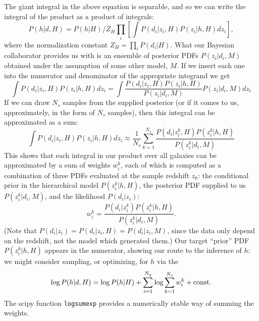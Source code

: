 \documentclass[11pt]{amsart}
\begin{document}
The giant integral in the above equation is separable, and so we can write the integral of the product as a product of integrals:
\begin{equation}
   P(h|d,H) = P(h|H)/Z_H \prod_i \left[ \int P(d_i|z_i,H) P(z_i|h,H)  dz_i \right],
\end{equation}
where the normalization constant $Z_H = \prod_i P(d_i|H)$.
What our Bayesian collaborator provides us with is an ensemble of
posterior PDFs $P(z_i|d_i,M)$ obtained under the assumption of some
other model, $M$. If we insert each one into the numerator and
denominator of the appropriate integrand we get
\begin{equation}
   \int P(d_i|z_i,H) P(z_i|h,H)  dz_i = \int \frac{P(d_i|z_i,H) P(z_i|h,H)}{P(z_i|d_i,M)} P(z_i|d_i,M) dz_i
\end{equation}
If we can draw $N_s$ samples from the supplied posterior (or if it comes to us, approximately, in the form of $N_s$ samples), then this integral can be approximated as a sum:
\begin{equation}
   \int P(d_i|z_i,H) P(z_i|h,H)  dz_i \approx \frac{1}{N_s} \sum_{k=1}^{N_s} \frac{P(d_i|z_i^k,H) P(z_i^k|h,H)} {P(z_i^k|d_i,M)}
\end{equation}
This shows that each integral in our product over all galaxies can be
approximated by a sum of weights $w_i^k$, each of which is computed as a
combination of three PDFs evaluated at the sample redshift $z_k$: the
conditional prior in the hierarchical model $P(z_i^k|h,H)$, the
posterior PDF supplied to us $P(z_i^k|d_i,M)$, and the likelihood
$P(d_i|z_i)$:
\begin{equation}
   w_i^k = \frac{P(d_i|z_i^k) P(z_i^k|h,H)} {P(z_i^k|d_i,M)}.
\end{equation}
(Note that $P(d_i|z_i) = P(d_i|z_i,H) = P(d_i|z_i,M)$, since the data
only depend on the redshift, not the model which generated them.) Our
target ``prior'' PDF $P(z_i^k|h,H)$ appears in the numerator, showing
our route to the inference of $h$: we might consider sampling, or
optimizing, for $h$ via the
\begin{equation}
    \log P(h|d,H) = \log P(h|H) + \sum_{i=1}^{N_g} \log \sum_{k=1}^{N_s} w_i^k + {\rm const.}
\end{equation}
The scipy function \texttt{logsumexp} provides a numerically stable way
of summing the weights.
\end{document}
